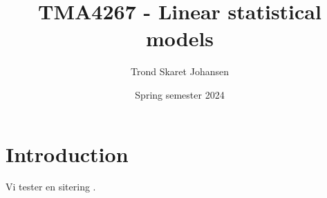 \documentclass[12pt, letterpaper]{article}
\title{TMA4267 - Linear statistical models}
\date{Spring semester 2024}
\author{Trond Skaret Johansen}
\begin{document}
\maketitle
\tableofcontents
\newpage

\section{Introduction} 

\label{sec:introduction}



\newpage







Vi tester en sitering \cite{test}.



\newpage\printbibliography{}
\newpage\printindex{}
\end{document}
